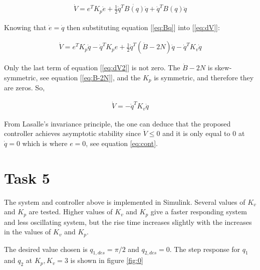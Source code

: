 \documentclass[a4paper,12pt,oneside,onecolumn]{article} %
\begin{document}
\begin{equation} \label{eq:dV}
\begin{aligned}
\dot{V}= e^T K_p \dot{e} + \frac{1}{2} \dot{q}^T \dot {B(q)} \dot{q} + \dot{q}^T B(q) \ddot{q}
\end{aligned}
\end{equation} 

Knowing that $\dot{e}=\dot{q}$ then substituting equation [\ref{eq:Bq}] into [\ref{eq:dV}]: 

\begin{equation} \label{eq:dV2}
\begin{aligned}
\dot{V} = e^T K_p \dot{q} - \dot{q}^T K_p e + \frac{1}{2} \dot{q}^T (\dot{B}-2N) \dot{q} - \dot{q}^T K_v \dot{q}
\end{aligned}
\end{equation}

Only the last term of equation [\ref{eq:dV2}] is not zero. The $\dot{B}-2N$ is skew-symmetric, see equation [\ref{eq:B-2N}], and the $K_p$ is symmetric, and therefore they are zeros. So,

\begin{equation} \label{eq:dV3}
\begin{aligned}
\dot{V} = - \dot{q}^T K_v \dot{q}
\end{aligned}
\end{equation}

From Lasalle's invariance principle, the one can deduce that the proposed controller achieves asymptotic stability since  $\dot{V} \leq 0$ and it is only equal to $0$ at $\dot{q}=0$ which is where $e=0$, see equation {\ref{eq:cont}}.


\section*{Task 5}
The system and controller above is implemented in Simulink. Several values of $K_v$ and $K_p$ are tested. Higher values of $K_v$ and $K_p$ give a faster responding system and less oscillating system, but the rise time increases slightly with the increases in the values of $K_v$ and $K_p$.

The desired value chosen is $q_{1,des} = \pi/2$ and $q_{2,des} = 0$. The step response for $q_1$ and $q_2$ at $K_p,K_v=3$ is shown in figure \ref{fig:0}
\end{document}
